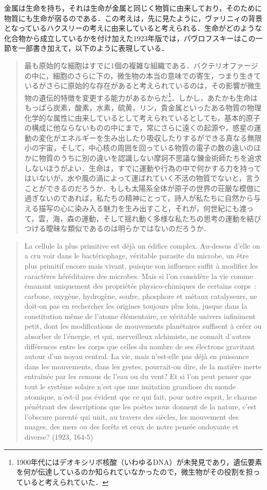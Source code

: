 金属は生命を持ち，それは生命が金属と同じく物質に由来しており，そのために物質にも生命が宿るのである．この考えは，先に見たように，ヴァリニィの背景となっているハクスリーの考えに由来していると考えられる．生命がどのような化合物から成立しているかを付け加えた1923年版では，パヴロフスキーはこの一節を一部書き加えて，以下のように表現している．
\begin{quote}
最も原始的な細胞はすでに1個の複雑な組織である．バクテリオファージの中に，細胞のさらに下の，微生物の本当の意味での寄生，つまり生きているがさらに原始的な存在があると考えられているのは，その影響が微生物の遺伝的特徴を変更する能力があるからだ\footnote{1900年代にはデオキシリボ核酸（いわゆるDNA）が未発見であり，遺伝要素を何が伝達しているのか知られていなかったので，微生物がその役割を担っていると考えられていた．}．しかし，あたかも生命はもっぱら炭素，酸素，水素，硫黄，リン，貴金属といったある物質の物理化学的な属性に由来しているとして考えられているとしても，基本的原子の構成に他ならないものの中にまで，常にさらに遠くの起源や，惑星の運動の変化がエネルギーを生み出したり吸収したりするができる真なる無限小の宇宙，そして，中心核の周囲を回っている物質の電子の数の違いのほかに物質のうちに別の違いを認識しない摩訶不思議な錬金術師たちを追求しないほうがよい．生命は，すでに運動や行為の中で何かする力を持ってはいないが，水や風の渦によって運ばれていく不活の物質でないと，言うことができるのだろうか．もしも太陽系全体が原子の世界の荘厳な模倣に過ぎないのであれば，私たちの精神にとって，詩人が私たちに自然から与える描写の心に染み入る魅力を生み出すこと，それが，何世紀にも渡って，雲，海，森の運動，そして揺れ動く多様な私たちの思考の運動を結びつける曖昧な類似であるのは明らかではないのだろうか．
\end{quote}
\begin{quote}
La cellule la plus primitive est déjà un édifice complex. Au-dessus d'elle on a cru voir dans le bactériophage, véritable parasite du microbe, un être plus primitif encore mais vivant, puisque son influence suffit à modifier les caractères héréditaires des microbes. Mais si l'on considère la vie comme émanant uniquement des propriétés physico-chimiques de certains corps~: carbone, oxygène, hydrogène, soufre, phosphore et métaux catalyseurs, ne doit-on pas en rechercher les origines toujours plus loin, jusque dans la constitution même de l'atome élémentaire, ce véritable univers infiniment petit, dont les modifications de mouvements planétaires suffisent à créer ou absorber de l'énergie, et qui, merveilleux alchimiste, ne connaît d'autres différences entre les corps que celles du nombre de ses électrons gravitant autour d'un noyau central. La vie, mais n'est-elle pas déjà en puissance dans les mouvements, dans les gestes, pourrait-on dire, de la matière inerte entraînée par les remous de l'eau ou du vent? Et si l'on peut penser que tout le système solaire n'est que une imitation grandiose du monde atomique, n'est-il pas évident que ce qui fait, pour notre esprit, le charme pénétrant des descriptions que les poètes nous donnent de la nature, c'est l'obscure parenté qui unit, au travers des siècles, les mouvement des nuages, des mers ou des forêts et ceux de notre pensée ondoyante et diverse? (1923, 164-5)
\end{quote}

